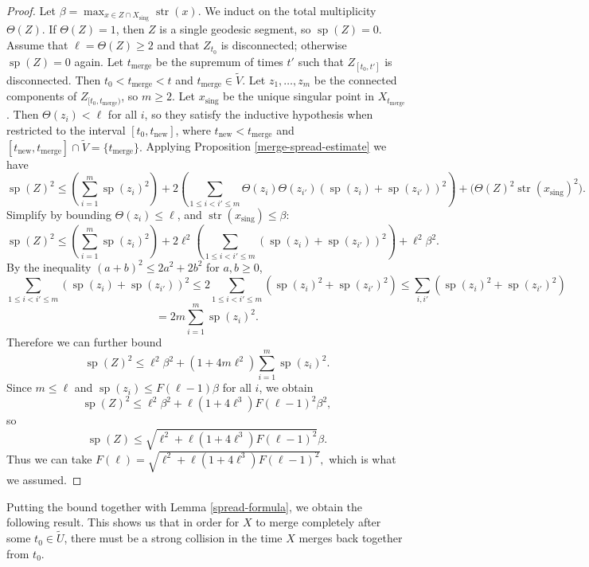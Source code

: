 \documentclass[11pt,reqno,twoside]{amsart}
\newcommand{\sing}{\mathrm{sing}}
\newcommand{\merge}{\mathrm{merge}}
\DeclareMathOperator{\spread}{\mathrm{sp}}
\DeclareMathOperator{\strength}{\mathrm{str}}
\theoremstyle{definition}
\begin{document}
\begin{proof}
    Let $\beta = \max_{x \in Z \cap X_\sing} \strength(x)$. We induct on the total multiplicity $\Theta(Z)$. If $\Theta(Z) = 1$, then $Z$ is a single geodesic segment, so $\spread(Z) = 0$. Assume that $\ell = \Theta(Z) \geq 2$ and that $Z_{t_0}$ is disconnected; otherwise $\spread(Z) = 0$ again. Let $t_\merge$ be the supremum of times $t'$ such that $Z_{[t_0,t']}$ is disconnected. Then $t_0 < t_\merge < t$ and $t_\merge \in \tilde V$.
    Let $z_1,\ldots,z_m$ be the connected components of $Z_{[t_0,t_\merge)}$, so $m \geq 2$. Let $x_\sing$ be the unique singular point in $X_{t_\merge}$. Then $\Theta(z_i) < \ell$ for all $i$, so they satisfy the inductive hypothesis when restricted to the interval $[t_0,t_{\mathrm{new}}]$, where $t_{\mathrm{new}} < t_\merge$ and $[t_{\mathrm{new}},t_\merge] \cap \tilde V = \{t_\merge\}.$ Applying Proposition \ref{merge-spread-estimate} we have 
    \[\spread(Z)^2 \leq \left( \sum_{i=1}^m \spread(z_i)^2 \right) + 2\left( \sum_{1 \leq i < i' \leq m} \Theta(z_i)\Theta(z_{i'})(\spread(z_i)+\spread(z_{i'}))^2 \right) + \bigg(\Theta(Z)^2 \strength(x_\sing)^2 \bigg).\]
    Simplify by bounding $\Theta(z_i) \leq \ell$, and $\strength(x_\sing) \leq \beta$:
    \[\spread(Z)^2 \leq \left( \sum_{i=1}^m \spread(z_i)^2 \right) + 2\ell^2\left( \sum_{1 \leq i < i' \leq m} (\spread(z_i)+\spread(z_{i'}))^2 \right) + \ell^2 \beta^2.\]
    By the inequality $(a+b)^2 \leq 2a^2 + 2b^2$ for $a,b \geq 0$,
    \[ \sum_{1 \leq i < i' \leq m} (\spread(z_i)+\spread(z_{i'}))^2 \leq 2\sum_{1 \leq i < i' \leq m} \left(\spread(z_i)^2+\spread(z_{i'})^2\right) \leq \sum_{i,i'} \left(\spread(z_i)^2+\spread(z_{i'})^2\right)\]
    \[= 2m\sum_{i=1}^m \spread(z_i)^2.\]
    Therefore we can further bound
    \[\spread(Z)^2 \leq \ell^2\beta^2 + (1 + 4m\ell^2) \sum_{i=1}^m \spread(z_i)^2.\]
    Since $m \leq \ell$ and $\spread(z_i) \leq F(\ell-1) \beta$ for all $i$, we obtain 
    \[\spread(Z)^2 \leq \ell^2\beta^2 + \ell(1 + 4\ell^3) F(\ell-1)^2\beta^2, \]
    so
     \[\spread(Z) \leq \sqrt{\ell^2 + \ell(1 + 4\ell^3) F(\ell-1)^2} \beta. \]
     Thus we can take $F(\ell) = \sqrt{\ell^2 + \ell(1+4\ell^3 )F(\ell-1)^2},$
     which is what we assumed.
\end{proof}

Putting the bound together with Lemma \ref{spread-formula}, we obtain the following result. This shows us that in order for $X$ to merge completely after some $t_0 \in \tilde U$, there must be a strong collision in the time $X$ merges back together from $t_0$.
\end{document}
